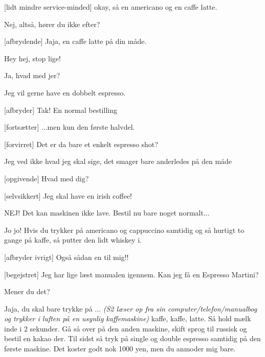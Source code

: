\documentclass[a4paper,11pt]{article}
\begin{document}
\begin{sketch}
[lidt mindre service-minded] okay, så en americano og en caffe latte.

 Nej, altså, hører du ikke efter?

[afbrydende] Jaja, en caffe latte på din måde.


 Hey hej, stop lige!


 Ja, hvad med jer?


 Jeg vil gerne have en dobbelt espresso.

[afbryder] Tak! En normal bestilling

[fortsætter] ...men kun den første halvdel.

[forvirret] Det er da bare et enkelt espresso shot?

 Jeg ved ikke hvad jeg skal sige, det smager bare anderledes på den måde


[opgivende] Hvad med dig? 

[selvsikkert] Jeg skal have en irish coffee!


 NEJ! Det kan maskinen ikke lave. Bestil nu bare noget normalt...

 Jo jo! Hvis du trykker på americano og cappuccino samtidig og så hurtigt to gange på kaffe, så putter den lidt whiskey i.

[afbryder ivrigt] Også sådan en til mig!!


[begejstret] Jeg har lige læst manualen igennem. Kan jeg få en Espresso Martini? 

 Mener du det?

 Jaja, du skal bare trykke på ... \textit{(S2 læser op fra sin computer/telefon/manualbog og trykker i luften på en usynlig kaffemaskine)} kaffe, kaffe, latte. Så hold mælk inde i 2 sekunder. Gå så over på den anden maskine, skift sprog til russisk og bestil en kakao der. Til sidst så tryk på single og double espresso samtidig på den første maskine. Det koster godt nok 1000 yen, men du anmoder mig bare.




\end{sketch}
\end{document}
